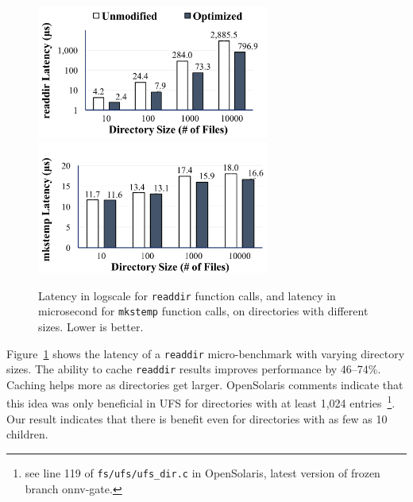 \begin{figure}
\scriptsize
\centering
\includegraphics[width=3in]{dcache/plots/lm_readdir.pdf}
\includegraphics[width=3in]{dcache/plots/lm_mkstemp.pdf}
\caption[The optimized {\tt readdir} and {\tt mkstemp} latency.]
{Latency in logscale for {\tt readdir} function calls, and latency in microsecond for {\tt mkstemp} function calls, on directories with different sizes. Lower is better. }
\label{fig:dcache:readdir}
\end{figure}

Figure~\ref{fig:dcache:readdir} shows the latency 
of a {\tt readdir} micro-benchmark with varying directory sizes.
The ability to cache {\tt readdir} results improves performance by 46--74\%.
Caching helps more as directories get larger.
OpenSolaris comments indicate that this idea was only beneficial 
in UFS for directories with at least 1,024 entries~\footnote{see line 119 of {\tt fs/ufs/ufs\_dir.c} in OpenSolaris, latest version of frozen branch onnv-gate.}.
Our result indicates that there is benefit even for directories with as few as 10 children.

